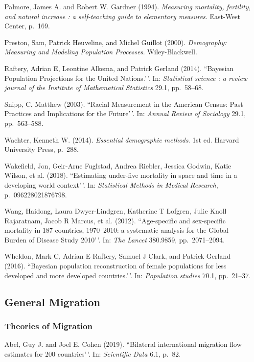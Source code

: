 \documentclass[11pt,]{article}
\begin{document}
Palmore, James A. and Robert W. Gardner (1994).
\emph{Measuring mortality, fertility, and natural increase : a self-teaching guide to elementary measures}.
East-West Center, p.~169.

Preston, Sam, Patrick Heuveline, and Michel Guillot (2000).
\emph{Demography: Measuring and Modeling Population Processes}.
Wiley-Blackwell.

Raftery, Adrian E, Leontine Alkema, and Patrick Gerland (2014).
``Bayesian Population Projections for the United Nations.'\,'. In:
\emph{Statistical science : a review journal of the Institute of Mathematical Statistics}
29.1, pp.~58--68.

Snipp, C. Matthew (2003). ``Racial Measurement in the American Census:
Past Practices and Implications for the Future'\,'. In:
\emph{Annual Review of Sociology} 29.1, pp.~563--588.

Wachter, Kenneth W. (2014). \emph{Essential demographic methods}. 1st
ed. Harvard University Press, p.~288.

Wakefield, Jon, Geir-Arne Fuglstad, Andrea Riebler, Jessica Godwin,
Katie Wilson, et al. (2018). ``Estimating under-five mortality in space
and time in a developing world context'\,'. In:
\emph{Statistical Methods in Medical Research}, p.~096228021876798.

Wang, Haidong, Laura Dwyer-Lindgren, Katherine T Lofgren, Julie Knoll
Rajaratnam, Jacob R Marcus, et al. (2012). ``Age-specific and
sex-specific mortality in 187 countries, 1970--2010: a systematic
analysis for the Global Burden of Disease Study 2010'\,'. In:
\emph{The Lancet} 380.9859, pp.~2071--2094.

Wheldon, Mark C, Adrian E Raftery, Samuel J Clark, and Patrick Gerland
(2016). ``Bayesian population reconstruction of female populations for
less developed and more developed countries.'\,'. In:
\emph{Population studies} 70.1, pp.~21--37.

\hypertarget{general-migration}{%
\subsection{General Migration}\label{general-migration}}

\hypertarget{theories-of-migration}{%
\subsubsection{Theories of Migration}\label{theories-of-migration}}

Abel, Guy J. and Joel E. Cohen (2019). ``Bilateral international
migration flow estimates for 200 countries'\,'. In:
\emph{Scientific Data} 6.1, p.~82.
\end{document}
